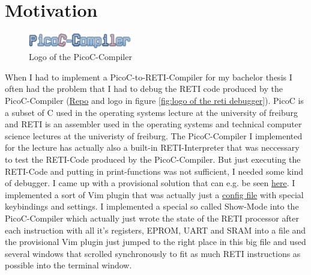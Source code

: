 \documentclass{report}
\begin{document}
\fontsize{10pt}{12pt}\selectfont




\tableofcontents
\thispagestyle{empty}
\clearpage
\pagestyle{plain}

\listoffigures
\newpage
\listoftables

\clearpage
{}
\pagestyle{default}

\chapter{Motivation}

\begin{figure}
	\centering
  \includegraphics[width=0.4\textwidth]{./figures/picoc_compiler.png}
	\caption{Logo of the PicoC-Compiler}
	\label{fig:logo of the picoc compiler}
\end{figure}

When I had to implement a PicoC-to-RETI-Compiler for my bachelor thesis I often had the problem that I had to debug the RETI code produced by the \alert{PicoC-Compiler} (\href{https://github.com/matthejue/PicoC-Compiler/tree/missing_semester_project}{Repo} and logo in figure \ref{fig:logo of the reti debugger}). \alert{PicoC} is a subset of C used in the operating systems lecture at the university of freiburg and \alert{RETI} is an assembler used in the operating systems and technical computer science lectures at the univeristy of freiburg. The PicoC-Compiler I implemented for the lecture has actually also a built-in \alert{RETI-Interpreter} that was neccessary to test the RETI-Code produced by the PicoC-Compiler. But just executing the RETI-Code and putting in print-functions was not sufficient, I needed some kind of debugger. I came up with a provisional solution that can e.g. be seen \href{https://asciinema.org/a/526542}{here}. I implemented a sort of Vim plugin that was actually just a \href{https://github.com/matthejue/PicoC-Compiler/blob/master/src/interpr_showcase.vim}{config file} with special keybindings and settings. I implemented a special so called \alert{Show-Mode} into the PicoC-Compiler which actually just wrote the state of the RETI processor after each instruction with all it's registers, EPROM, UART and SRAM into a file and the provisional Vim plugin just jumped to the right place in this big file and used several windows that scrolled synchronously to fit as much RETI instructions as possible into the terminal window.
\end{document}
